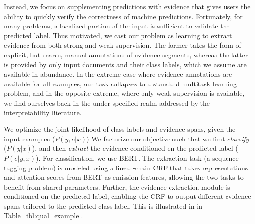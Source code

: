 \documentclass{article}
\begin{document}
Instead, we focus on supplementing 
predictions with 
evidence that gives users the ability to quickly verify 
the correctness of machine predictions. 
Fortunately, for many problems, a localized portion of the input
is sufficient to validate the predicted label. 
Thus motivated, we cast our problem as learning to extract evidence
from both strong and weak supervision.
The former takes the form of explicit, but scarce, 
manual annotations of evidence segments,
whereas the latter is provided by only input documents and their class labels, 
which we assume are available in abundance.
In the extreme case where evidence annotations 
are available for all examples,
our task collapses to a standard multitask learning problem,
and in the opposite extreme,
where only weak supervision is available, 
we find ourselves back in the under-specified realm 
addressed by the interpretability literature.

We optimize the joint likelihood of class
labels and evidence spans, given the input examples ($P(y, e | x)$)
We factorize our objective such that 
we first \emph{classify} ($P(y | x)$), and then \emph{extract} the evidence conditioned on the predicted label ($P(e | y, x)$).
For classification, we use 
BERT. %
The extraction task (a sequence tagging problem)
is modeled 
using a linear-chain CRF %
that takes representations and attention scores 
from BERT as emission features, 
allowing the two tasks to benefit from shared parameters.
Further, the evidence extraction module is 
conditioned on the predicted label, 
enabling the CRF to output different evidence spans 
tailored to the predicted class label.
This is illustrated in in Table~\ref{tbl:qual_example}. %
\end{document}
